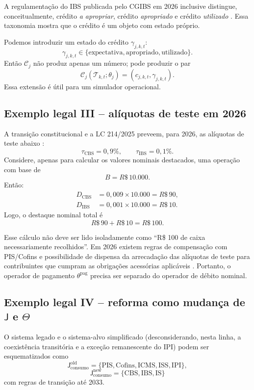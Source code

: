 \documentclass[11pt,a4paper]{article}
\newcommand{\CBS}{\mathrm{CBS}}
\newcommand{\IBS}{\mathrm{IBS}}
\newcommand{\ICMS}{\mathrm{ICMS}}
\newcommand{\ISS}{\mathrm{ISS}}
\newcommand{\IPI}{\mathrm{IPI}}
\newcommand{\PIS}{\mathrm{PIS}}
\newcommand{\COFINS}{\mathrm{Cofins}}
\newcommand{\IS}{\mathrm{IS}}
\newcommand{\cT}{\mathcal{T}}
\newcommand{\cC}{\mathcal{C}}
\begin{document}
A regulamentação do IBS publicada pelo CGIBS em 2026 inclusive distingue, conceitualmente, crédito \emph{a apropriar}, crédito \emph{apropriado} e crédito \emph{utilizado} \cite{CGIBS6}. Essa taxonomia mostra que o crédito é um objeto com estado próprio.

\begin{formalizacao}
Podemos introduzir um estado do crédito $\gamma_{j,k,t}$:
\[
\gamma_{j,k,t}\in
\{\mathrm{expectativa},\mathrm{apropriado},\mathrm{utilizado}\}.
\]
Então $\cC_j$ não produz apenas um número; pode produzir o par
\[
\cC_j(\cT_{k,t};\theta_j)=(c_{j,k,t},\gamma_{j,k,t}).
\]
Essa extensão é útil para um simulador operacional.
\end{formalizacao}

\subsection{Exemplo legal III -- alíquotas de teste em 2026}

A transição constitucional e a LC 214/2025 preveem, para 2026, as alíquotas de teste abaixo \cite{EC132,LC214,RFB2026}:
\[
\tau_{\CBS}=0{,}9\%,
\qquad
\tau_{\IBS}=0{,}1\%.
\]
Considere, apenas para calcular os valores nominais destacados, uma operação com base de
\[
B=R\$\,10.000.
\]
Então:
\begin{align*}
D_{\CBS}&=0{,}009\times 10.000=R\$\,90,\\
D_{\IBS}&=0{,}001\times 10.000=R\$\,10.
\end{align*}
Logo, o destaque nominal total é
\[
R\$\,90+R\$\,10=R\$\,100.
\]

\begin{cuidado}
Esse cálculo não deve ser lido isoladamente como ``R\$ 100 de caixa necessariamente recolhidos''. Em 2026 existem regras de compensação com PIS/Cofins e possibilidade de dispensa da arrecadação das alíquotas de teste para contribuintes que cumpram as obrigações acessórias aplicáveis \cite{RFB2026}. Portanto, o operador de pagamento $\theta^{\mathrm{pag}}$ precisa ser separado do operador de débito nominal.
\end{cuidado}

\subsection[Exemplo legal IV - reforma como mudança de J e Theta]{Exemplo legal IV -- reforma como mudança de $\mathsf J$ e $\Theta$}

O sistema legado e o sistema-alvo simplificado (desconsiderando, nesta linha, a coexistência transitória e a exceção remanescente do IPI) podem ser esquematizados como
\[
\mathsf J^{\mathrm{old}}_{\mathrm{consumo}}
=\{\PIS,\COFINS,\ICMS,\ISS,\IPI\},
\]
\[
\mathsf J^{\mathrm{new}}_{\mathrm{consumo}}
=\{\CBS,\IBS,\IS\}
\]
com regras de transição até 2033.
\end{document}
